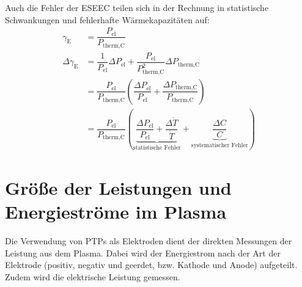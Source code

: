 Auch die Fehler der ESEEC teilen sich in der Rechnung in statistische Schwankungen und fehlerhafte Wärmekapazitäten auf:
\begin{align*}
	\gamma_\text{E} &= \dfrac{P_\text{el}}{P_\text{therm,C}}\\
	\Delta \gamma_\text{E} &= \dfrac{1}{P_\text{el}} \Delta P_\text{el} + \dfrac{P_\text{el}}{P_\text{therm,C}^2} \Delta P_\text{therm,C}\\
					&= \dfrac{P_\text{el}}{P_\text{therm,C}} \left( \dfrac{\Delta P_\text{el}}{P_\text{el}} + \dfrac{\Delta P_\text{therm,C}}{P_\text{therm,C}} \right)\\
					&= \dfrac{P_\text{el}}{P_\text{therm,C}} \left( \underbrace{\dfrac{\Delta P_\text{el}}{P_\text{el}} + \dfrac{\Delta \dot{T}}{ \dot{T}}}_{\text{statistische Fehler}} + \underbrace{\dfrac{\Delta C}{C}}_\text{systematischer Fehler} \right)
\end{align*}




\section{Größe der Leistungen und Energieströme im Plasma}\label{sec:energiestroeme}
Die Verwendung von PTPs als Elektroden dient der direkten Messungen der Leistung aus dem Plasma. Dabei wird der Energiestrom nach der Art der Elektrode (positiv, negativ und geerdet, bzw. Kathode und Anode) aufgeteilt. Zudem wird die elektrische Leistung gemessen.\\

